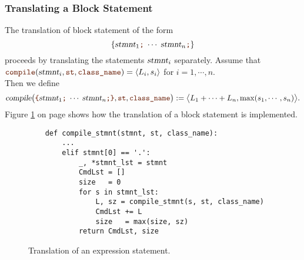 \subsubsection{Translating a Block Statement}
The translation of block statement of the form
\[ \{ \textsl{stmnt}_1\mytt{;}\; \cdots\; \textsl{stmnt}_n\mytt{;} \} \]
proceeds by translating the statements $\textsl{stmnt}_i$ separately.  Assume that
\\[0.2cm]
\hspace*{1.3cm}
$\mytt{compile}(\textsl{stmnt}_i, \mytt{st}, \mytt{class\_name}) = \pair(L_i, s_i)$
\quad for $i=1,\cdots,n$.
\\[0.2cm]
Then we define
\[
     \textsl{compile}\bigl(\mytt{\{} \textsl{stmnt}_1\mytt{;}\; \cdots\; \textsl{stmnt}_n\mytt{;} \mytt{\}},
     \mytt{st}, \mytt{class\_name}\bigr) :=
     \bigl\langle L_1 + \cdots + L_n, \max(s_1, \cdots, s_n) \bigr\rangle.
\]
Figure \ref{fig:Compiler.ipynb:compile:block} on page \pageref{fig:Compiler.ipynb:compile:block} shows how the
translation of a block statement is implemented.

\begin{figure}[!ht]
\centering
\begin{verbatim}
    def compile_stmnt(stmnt, st, class_name):
        ...
        elif stmnt[0] == '.':
            _, *stmnt_lst = stmnt 
            CmdLst = []
            size   = 0
            for s in stmnt_lst:
                L, sz = compile_stmnt(s, st, class_name)
                CmdLst += L
                size   = max(size, sz)
            return CmdLst, size
\end{verbatim}
\vspace*{-0.3cm}
\caption{Translation of an expression statement.}
\label{fig:Compiler.ipynb:compile:block}
\end{figure}


